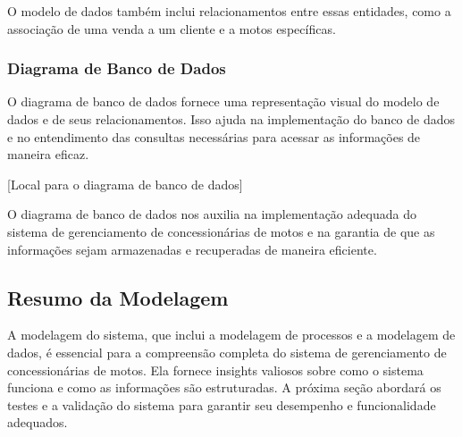 O modelo de dados também inclui relacionamentos entre essas entidades, como a associação de uma venda a um cliente e a motos específicas.

\subsubsection{Diagrama de Banco de Dados}

O diagrama de banco de dados fornece uma representação visual do modelo de dados e de seus relacionamentos. Isso ajuda na implementação do banco de dados e no entendimento das consultas necessárias para acessar as informações de maneira eficaz.

[Local para o diagrama de banco de dados]

O diagrama de banco de dados nos auxilia na implementação adequada do sistema de gerenciamento de concessionárias de motos e na garantia de que as informações sejam armazenadas e recuperadas de maneira eficiente.

\subsection{Resumo da Modelagem}

A modelagem do sistema, que inclui a modelagem de processos e a modelagem de dados, é essencial para a compreensão completa do sistema de gerenciamento de concessionárias de motos. Ela fornece insights valiosos sobre como o sistema funciona e como as informações são estruturadas. A próxima seção abordará os testes e a validação do sistema para garantir seu desempenho e funcionalidade adequados.


